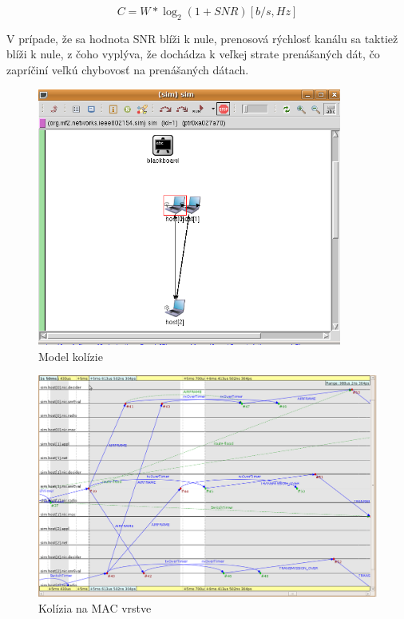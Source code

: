 \documentclass[11pt,twoside,a4paper]{book}
\begin{document}
$$ C = W * \log_{2} (1 + SNR) [b/s, Hz] $$

V prípade, že sa hodnota SNR blíži k nule, prenosová rýchlosť kanálu sa taktiež blíži k nule, z čoho vyplýva, že dochádza k veľkej strate prenášaných dát, čo zapríčiní veľkú chybovosť na prenášaných dátach. \\

\begin{figure}[h]
 \centering
 \includegraphics[width=10cm]{./figures/modelKolizie.png}
 \caption{Model kolízie}
 \label{fig:modelKolizie}
\end{figure}

\begin{figure}[h]
 \centering
 \includegraphics[angle=90, width=15cm]{./figures/kolizia.png}
 \caption{Kolízia na MAC vrstve}
 \label{fig:kolizia}
\end{figure}
\end{document}
